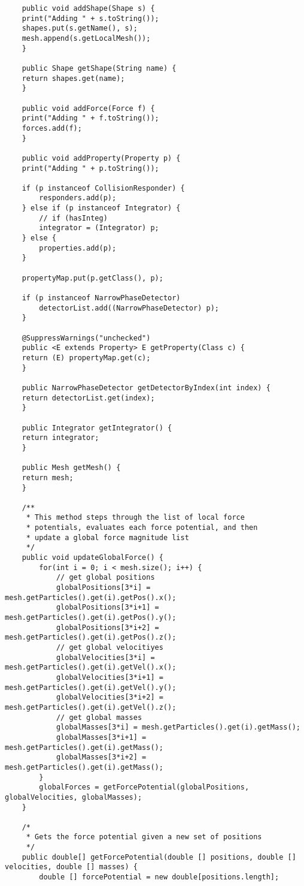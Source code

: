 \begin{lstlisting}
    public void addShape(Shape s) {
	print("Adding " + s.toString());
	shapes.put(s.getName(), s);
	mesh.append(s.getLocalMesh());
    }

    public Shape getShape(String name) {
	return shapes.get(name);
    }

    public void addForce(Force f) {
	print("Adding " + f.toString());
	forces.add(f);
    }
	
    public void addProperty(Property p) {
	print("Adding " + p.toString());

	if (p instanceof CollisionResponder) {
	    responders.add(p);
	} else if (p instanceof Integrator) {
	    // if (hasInteg)
	    integrator = (Integrator) p;
	} else {
	    properties.add(p);
	}

	propertyMap.put(p.getClass(), p);

	if (p instanceof NarrowPhaseDetector)
	    detectorList.add((NarrowPhaseDetector) p);
    }

    @SuppressWarnings("unchecked")
    public <E extends Property> E getProperty(Class c) {
	return (E) propertyMap.get(c);
    }

    public NarrowPhaseDetector getDetectorByIndex(int index) {
	return detectorList.get(index);
    }

    public Integrator getIntegrator() {
	return integrator;
    }
	
    public Mesh getMesh() {
	return mesh;
    }

	/**
     * This method steps through the list of local force 
     * potentials, evaluates each force potential, and then 
     * update a global force magnitude list 
     */	
	public void updateGlobalForce() {
		for(int i = 0; i < mesh.size(); i++) {
			// get global positions
			globalPositions[3*i] = mesh.getParticles().get(i).getPos().x();
			globalPositions[3*i+1] = mesh.getParticles().get(i).getPos().y();
			globalPositions[3*i+2] = mesh.getParticles().get(i).getPos().z();
			// get global velocitiyes
			globalVelocities[3*i] = mesh.getParticles().get(i).getVel().x();
			globalVelocities[3*i+1] = mesh.getParticles().get(i).getVel().y();
			globalVelocities[3*i+2] = mesh.getParticles().get(i).getVel().z();
			// get global masses
			globalMasses[3*i] = mesh.getParticles().get(i).getMass();
			globalMasses[3*i+1] = mesh.getParticles().get(i).getMass();
			globalMasses[3*i+2] = mesh.getParticles().get(i).getMass();
		}		
		globalForces = getForcePotential(globalPositions, globalVelocities, globalMasses);
	}
	
	/*
	 * Gets the force potential given a new set of positions
	 */
	public double[] getForcePotential(double [] positions, double [] velocities, double [] masses) {
		double [] forcePotential = new double[positions.length];
		

\end{lstlisting}
